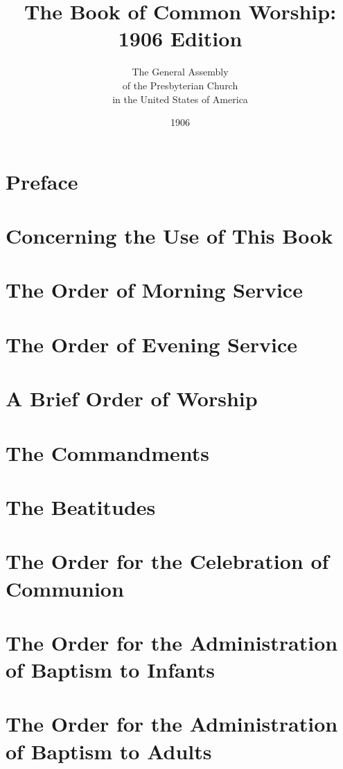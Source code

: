 \documentclass[titlepage,a5paper,12pt]{book}
\title{The Book of Common Worship: 1906 Edition}
\author{The General Assembly \\ of the Presbyterian Church \\ in the United States of America}
\date{1906}
\begin{document}
\frontmatter

\maketitle

\chapter{Preface}

\chapter{Concerning the Use of This Book}


\tableofcontents

\mainmatter
\chapter[Morning Service]{The Order of Morning Service}

\chapter[Evening Service]{The Order of Evening Service}

\chapter{A Brief Order of Worship}

\chapter{The Commandments}

\chapter{The Beatitudes}


\chapter[Order for Communion]{The Order for the Celebration of Communion}

\chapter[Baptism of Infants]{The Order for the Administration of Baptism to Infants}

\chapter[Baptism of Adults]{The Order for the Administration of Baptism to Adults}
\end{document}

